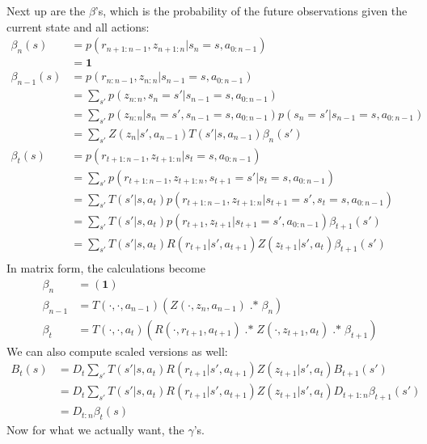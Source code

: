 \documentclass[10pt,english]{article}
\begin{document}
Next up are the $\beta$'s, which is the probability of the future observations given the current state and all actions:
\begin{align}
\beta_n(s) &= p(r_{n+1:n-1}, z_{n+1:n} | s_n = s, a_{0:n-1}) \\
&= \mathbf{1} \\
\beta_{n-1}(s) &= p(r_{n:n-1}, z_{n:n} | s_{n-1} = s, a_{0:n-1}) \\
&= \sum_{s'} p(z_{n:n}, s_n = s'| s_{n-1} = s, a_{0:n-1}) \\
&= \sum_{s'} p(z_{n:n}| s_n = s', s_{n-1} = s, a_{0:n-1}) p(s_n = s'| s_{n-1} = s, a_{0:n-1}) \\
&= \sum_{s'} Z(z_{n}|s', a_{n-1}) T(s'| s, a_{n-1}) \beta_n(s') \\
\beta_{t}(s) &= p(r_{t+1:n-1}, z_{t+1:n} | s_{t} = s, a_{0:n-1}) \\
&= \sum_{s'} p(r_{t+1:n-1}, z_{t+1:n}, s_{t+1} = s' | s_{t} = s, a_{0:n-1}) \\
&= \sum_{s'} T(s' | s, a_{t}) p(r_{t+1:n-1}, z_{t+1:n} |s_{t+1} = s', s_{t} = s, a_{0:n-1}) \\
&= \sum_{s'} T(s' | s, a_{t}) p(r_{t+1}, z_{t+1} |s_{t+1} = s', a_{0:n-1}) \beta_{t+1}(s') \\
&= \sum_{s'} T(s' | s, a_{t}) R(r_{t+1} |s', a_{t+1}) Z(z_{t+1} |s', a_{t}) \beta_{t+1}(s') \\
\end{align}
In matrix form, the calculations become
\begin{align}
\beta_n &= \mathbf{(1)} \\
\beta_{n-1} &= T(\cdot,\cdot,a_{n-1}) \left( Z(\cdot, z_n, a_{n-1}) \operatorname{.*} \beta_n \right) \\
\beta_t &= T(\cdot,\cdot,a_{t}) \left( R(\cdot, r_{t+1}, a_{t+1}) \operatorname{.*} Z(\cdot, z_{t+1}, a_{t}) \operatorname{.*} \beta_{t+1} \right)
\end{align}
We can also compute scaled versions as well:
\begin{align}
B_t(s) &= D_t \sum_{s'} T(s' | s, a_{t}) R(r_{t+1} |s', a_{t+1}) Z(z_{t+1} |s', a_{t}) B_{t+1}(s') \\
&= D_t \sum_{s'} T(s' | s, a_{t}) R(r_{t+1} |s', a_{t+1}) Z(z_{t+1} |s', a_{t}) D_{t+1:n} \beta_{t+1}(s') \\
&= D_{t:n} \beta_t(s)
\end{align}
Now for what we actually want, the $\gamma$'s.
\end{document}
